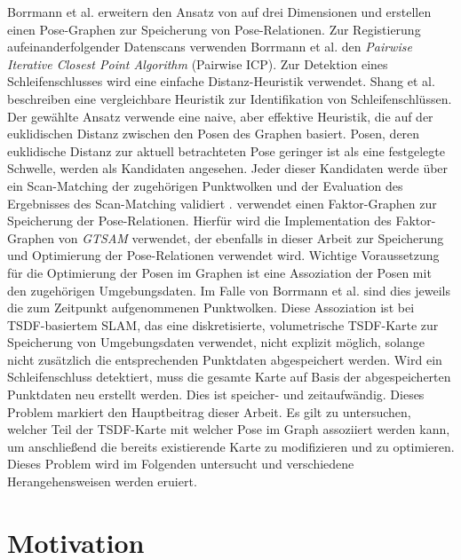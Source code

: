 Borrmann et al. \cite{borrmann2008globally} erweitern den Ansatz von \cite{lu1997globally} auf drei Dimensionen und erstellen einen Pose-Graphen zur Speicherung von Pose-Relationen. Zur Registierung aufeinanderfolgender Datenscans verwenden Borrmann et al. \cite{borrmann2008globally} den \textit{Pairwise Iterative Closest Point Algorithm} (Pairwise ICP). Zur Detektion eines Schleifenschlusses wird eine einfache Distanz-Heuristik verwendet. Shang et al. \cite{shan2020lio} beschreiben eine vergleichbare Heuristik zur Identifikation von Schleifenschlüssen. Der gewählte Ansatz verwende eine naive, aber effektive Heuristik, die auf der euklidischen Distanz zwischen den Posen des Graphen basiert. Posen, deren euklidische Distanz zur aktuell betrachteten Pose geringer ist als eine festgelegte Schwelle, werden als Kandidaten angesehen. Jeder dieser Kandidaten werde über ein Scan-Matching der zugehörigen Punktwolken und der Evaluation des Ergebnisses des Scan-Matching validiert \cite{shan2020lio}. \cite{shan2020lio} verwendet einen Faktor-Graphen zur Speicherung der Pose-Relationen. Hierfür wird die Implementation des Faktor-Graphen von \emph{GTSAM} \cite{dellaert2012factor} verwendet, der ebenfalls in dieser Arbeit zur Speicherung und Optimierung der Pose-Relationen verwendet wird.
Wichtige Voraussetzung für die Optimierung der Posen im Graphen ist eine Assoziation der Posen mit den zugehörigen Umgebungsdaten. Im Falle von Borrmann et al. \cite{borrmann2008globally} sind dies jeweils die zum Zeitpunkt aufgenommenen Punktwolken. Diese Assoziation ist bei TSDF-basiertem SLAM, das eine diskretisierte, volumetrische TSDF-Karte zur Speicherung von Umgebungsdaten verwendet, nicht explizit möglich, solange nicht zusätzlich die entsprechenden Punktdaten abgespeichert werden. Wird ein Schleifenschluss detektiert, muss die gesamte Karte auf Basis der abgespeicherten Punktdaten neu erstellt werden. Dies ist speicher- und zeitaufwändig. Dieses Problem markiert den Hauptbeitrag dieser Arbeit. Es gilt zu untersuchen, welcher Teil der TSDF-Karte mit welcher Pose im Graph assoziiert werden kann, um anschließend die bereits existierende Karte zu modifizieren und zu optimieren. Dieses Problem wird im Folgenden untersucht und verschiedene Herangehensweisen werden eruiert.


\section{Motivation}

